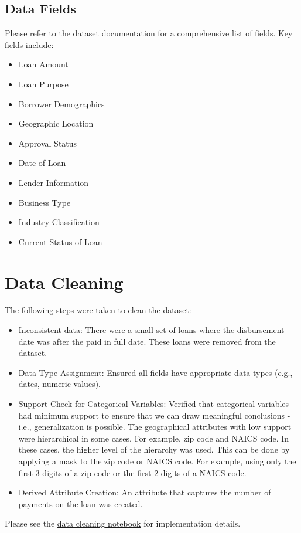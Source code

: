 \documentclass[12pt]{article}
\begin{document}
\subsection{Data Fields}
Please refer to the dataset documentation for a comprehensive list of fields. Key fields include:
\begin{itemize}
    \item Loan Amount
    \item Loan Purpose
    \item Borrower Demographics
    \item Geographic Location
    \item Approval Status
    \item Date of Loan
    \item Lender Information
    \item Business Type
    \item Industry Classification
    \item Current Status of Loan    
\end{itemize}

\section{Data Cleaning}
The following steps were taken to clean the dataset:
\begin{itemize}
    \item Inconsistent data: There were a small set of loans where the disbursement date was after the paid in full date. These loans were removed from the dataset.
    \item Data Type Assignment: Ensured all fields have appropriate data types (e.g., dates, numeric values).
    \item Support Check for Categorical Variables: Verified that categorical variables had minimum support to ensure that we can draw meaningful conclusions - i.e., generalization is possible. The geographical attributes with low support were hierarchical in some cases. For example, zip code and NAICS code. In these cases, the higher level of the hierarchy was used. This can be done by applying a mask to the zip code or NAICS code. For example, using only the first 3 digits of a zip code or the first 2 digits of a NAICS code. 
    \item Derived Attribute Creation: An attribute that captures the number of payments on the loan was created.
\end{itemize}
Please see the \href{https://github.com/rajivsam/descriptive_analytics/blob/main/notebooks/sba_loans.ipynb}{data cleaning notebook} for implementation details.
\end{document}
